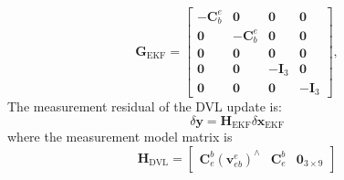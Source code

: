 \documentclass[conference]{IEEEtran}
\begin{document}
\begin{equation}
\mathbf G_{\text{EKF}}=
\begin{bmatrix}
-\mathbf C_b^e & \mathbf 0 & \mathbf 0 & \mathbf 0\\
\mathbf 0 & -\mathbf C_b^e & \mathbf 0 & \mathbf 0\\
\mathbf 0 & \mathbf 0 & \mathbf 0 & \mathbf 0\\
\mathbf 0 & \mathbf 0 & -\mathbf I_3 & \mathbf 0\\
\mathbf 0 & \mathbf 0 & \mathbf 0 & -\mathbf I_3
\end{bmatrix},
\end{equation}
The measurement residual of the DVL update is:  
\begin{equation}
  \delta \boldsymbol{y} = \mathbf H_{\text{EKF}} \delta \boldsymbol{x}_{\text{EKF}}
\end{equation}
where the measurement model matrix is
\begin{equation}
\mathbf H_{\mathrm{DVL}}
=
\begin{bmatrix}
\mathbf C_e^b(\boldsymbol v_{eb}^e)^\wedge
&
\mathbf C_e^b
&
\mathbf 0_{3\times 9}
\end{bmatrix}
\end{equation}

\end{document}

